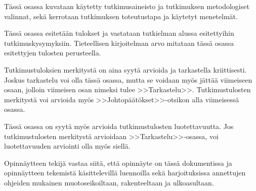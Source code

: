 \documentclass[english,12pt,a4paper,pdftex,sci,utf8]{aaltothesis}
\begin{document}

T\"ass\"a osassa kuvataan k\"aytetty tutkimusaineisto ja
tutkimuksen metodologiset valinnat, sek\"a
kerrotaan tutkimuksen toteutustapa ja k\"aytetyt menetelm\"at.


T\"ass\"a osassa esitet\"a\"an tulokset ja vastataan tutkielman alussa
esitettyihin tutkimuskysymyksiin. Tieteellisen kirjoitelman
arvo mitataan t\"ass\"a osassa esitettyjen tulosten perusteella.

Tutkimustuloksien merkityst\"a on aina syyt\"a arvioida ja tarkastella
kriittisesti.  Joskus tarkastelu voi olla t\"ass\"a osassa, mutta se
voidaan my\"os j\"att\"a\"a viimeiseen osaan, jolloin viimeisen osan nimeksi
tulee >>Tarkastelu>>. Tutkimustulosten merkityst\"a voi arvioida my\"os
>>Johtop\"a\"at\"okset>>-otsikon alla viimeisess\"a osassa.


T\"ass\"a osassa on syyt\"a my\"os arvioida tutkimustulosten luotettavuutta.
Jos tutkimustulosten merkityst\"a arvioidaan >>Tarkastelu>>-osassa,
voi luotettavuuden arviointi olla my\"os siell\"a.

Opinn\"aytteen tekij\"a vastaa siit\"a, ett\"a opinn\"ayte on t\"ass\"a dokumentissa
ja opinn\"aytteen tekemist\"a k\"asittelevill\"a luennoilla sek\"a
harjoituksissa annettujen ohjeiden mukainen muotoseikoiltaan,
rakenteeltaan ja ulkoasultaan.

\clearpage
\end{document}
